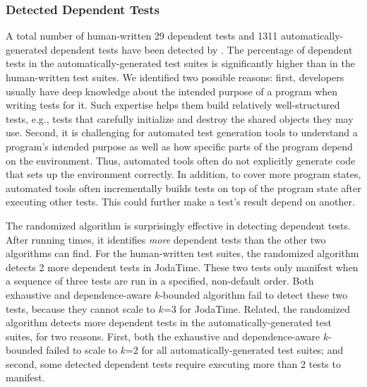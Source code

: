 \subsubsection{Detected Dependent Tests}
\label{sec:detectedtests}

A total number of human-written 29 dependent tests and 1311
automatically-generated dependent tests have been detected
by \ourtool. The percentage of dependent tests
in the automatically-generated test suites is significantly
higher than in the human-written test suites. We identified
two possible reasons: first, developers usually have deep
knowledge about the intended purpose of a program when writing tests
for it. Such expertise helps them build relatively well-structured
tests, e.g., tests that carefully initialize and destroy the
shared objects they may use. Second, 
 it is challenging for automated test generation tools to understand
 a program's intended purpose as well as how
specific parts of the program depend on the environment.
Thus, automated tools often do not explicitly generate code that sets up the
environment correctly.  In addition, to cover more
program states, automated tools often incrementally
builds tests on top of the program state after executing
other tests. This could further make a test's result depend on another.





The randomized algorithm is surprisingly effective in
detecting dependent tests. After running \trialnum times,
it identifies \textit{more} dependent tests than the other
two algorithms can find. For the human-written
test suites, the randomized algorithm detects 2 more dependent
tests in JodaTime. These two tests only
manifest when a sequence of three tests are run in a specified,
non-default order. Both exhaustive and dependence-aware $k$-bounded
algorithm fail to detect these two tests, because
they cannot scale to $k$=3 for 
JodaTime. Related, the randomized algorithm
detects more dependent
tests in the automatically-generated test suites, for
two reasons. First,
both the exhaustive and dependence-aware $k$-bounded
failed to scale to $k$=2 for all automatically-generated test suites;
and second, some detected dependent tests require executing more than 2 tests
to manifest.


